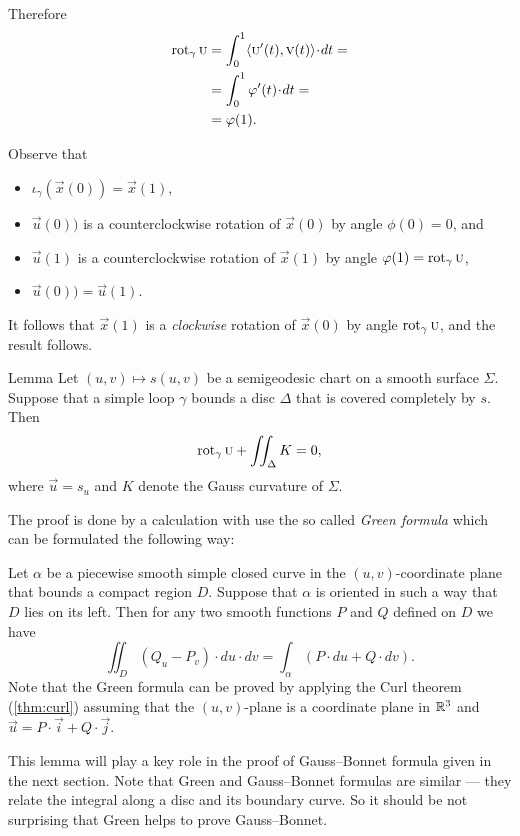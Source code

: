 Therefore
\begin{align*}
\rot_\gamma\vec u&=\int_0^1\langle\vec u'(t),\vec v(t)\rangle\cdot dt=
\\
&=\int_0^1\phi'(t)\cdot dt=
\\
&=\phi(1).
\end{align*}

Observe that 
\begin{itemize}
\item $\iota_\gamma(\vec x(0))=\vec x(1)$,

\item $\vec u(0))$ is a counterclockwise rotation of $\vec x(0)$ by angle $\phi(0)=0$, and 

\item $\vec u(1)$ is a counterclockwise rotation of $\vec x(1)$ by angle $\phi(1)\z=\rot_\gamma\vec u$,

\item $\vec u(0))=\vec u(1)$.
\end{itemize}
It follows that $\vec x(1)$ is a {}\emph{clockwise} rotation of $\vec x(0)$ by angle $\mathop{\rm rot}\nolimits_\gamma\textsc u$, and the result follows.
\qeds

\begin{thm}{Lemma}\label{lem:rotation-semigeoesic}
Let $(u,v)\mapsto s(u,v)$ be a semigeodesic chart on a smooth surface $\Sigma$.
Suppose that a simple loop $\gamma$ bounds a disc $\Delta$ that is covered completely by $s$.
Then 
\[\mathop{\rm rot}\nolimits_\gamma\textsc u+\iint_\Delta K=0,\]
where $\vec u=s_u$ and $K$ denote the Gauss curvature of $\Sigma$.
\end{thm}

The proof is done by a calculation with use the so called \emph{Green formula} which can be formulated the following way:

Let $\alpha$ be a piecewise smooth simple closed curve in the $(u,v)$-coordinate plane that bounds a compact region $D$.
Suppose that $\alpha$ is oriented in such a way that $D$ lies on its left.
Then for any two smooth functions $P$ and $Q$ defined on $D$ we have
\[\iint_D (Q_u- P_v)\cdot du\cdot dv=\int_\alpha (P\cdot du+Q\cdot dv).\]
Note that the Green formula can be proved by applying the Curl theorem (\ref{thm:curl}) assuming that the $(u,v)$-plane is a coordinate plane in $\mathbb{R}^3$ and $\vec u=P\cdot\vec i+Q\cdot \vec j$.

This lemma will play a key role in the proof of Gauss--Bonnet formula given in the next section.
Note that Green and Gauss--Bonnet formulas are similar --- they relate the integral along a disc and its boundary curve.
So it should be not surprising that Green helps to prove Gauss--Bonnet.

